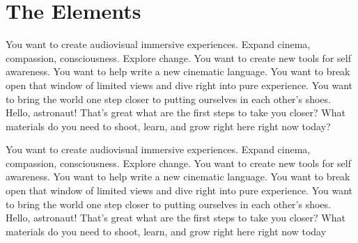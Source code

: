 \chapter{The Elements}
\begin{fullwidth}

\problem


You want to create audiovisual immersive experiences. Expand cinema, compassion, consciousness. Explore change. You want to create new tools for self awareness. You want to help write a new cinematic language. You want to break open that window of limited views and dive right into pure experience. You want to bring the world one step closer to putting ourselves in each other's shoes. Hello, astronaut! That's great what are the first steps to take you closer? What materials do you need to shoot, learn, and grow right here right now today?

\solution


You want to create audiovisual immersive experiences. Expand cinema, compassion, consciousness. Explore change. You want to create new tools for self awareness. You want to help write a new cinematic language. You want to break open that window of limited views and dive right into pure experience. You want to bring the world one step closer to putting ourselves in each other's shoes. Hello, astronaut! That's great what are the first steps to take you closer? What materials do you need to shoot, learn, and grow right here right now today

\clearpage

\end{fullwidth}
